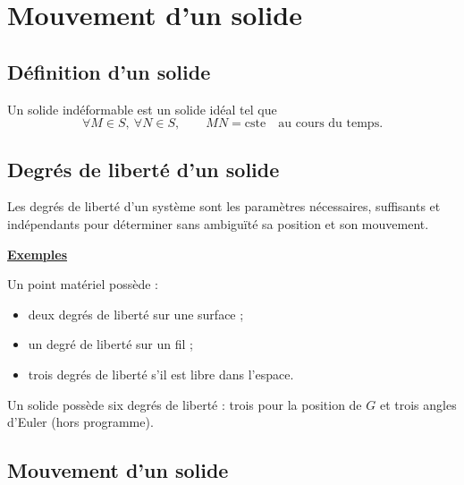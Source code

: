 \documentclass[11pt,a4paper]{article}
\newcommand{\cste}{\mathrm{cste}}
\newcommand{\titr}[1]{\par\textbf{\underline{#1}}\par\nopagebreak[3]}
\begin{document}
\section{Mouvement d'un solide}
\subsection{Définition d'un solide}
Un solide indéformable est un solide idéal tel que
\[\forall M\in S,\ \forall N\in S,\qquad MN=\cste\quad\text{au cours du temps}.\]
\subsection{Degrés de liberté d'un solide}
Les degrés de liberté d'un système sont les paramètres nécessaires, suffisants et indépendants pour déterminer sans ambiguïté sa position et son mouvement.
\begin{exemple}
\titr{Exemples}
Un point matériel possède :
\begin{itemize}
\item deux degrés de liberté sur une surface ;
\item un degré de liberté sur un fil ;
\item trois degrés de liberté s'il est libre dans l'espace.
\end{itemize}
Un solide possède six degrés de liberté : trois pour la position de $G$ et trois angles d'Euler (hors programme).
\begin{center}\end{center}
\end{exemple}
\subsection{Mouvement d'un solide}
\end{document}
